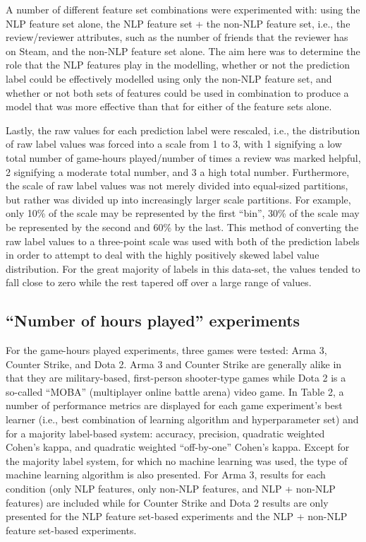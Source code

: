 \documentclass[9pt]{article}
\begin{document}
A number of different feature set combinations were experimented with: using the NLP feature set alone, the NLP feature set + the non-NLP feature set, i.e., the review/reviewer attributes, such as the number of friends that the reviewer has on Steam, and the non-NLP feature set alone. The aim here was to determine the role that the NLP features play in the modelling, whether or not the prediction label could be effectively modelled using only the non-NLP feature set, and whether or not both sets of features could be used in combination to produce a model that was more effective than that for either of the feature sets alone.

Lastly, the raw values for each prediction label were rescaled, i.e., the distribution of raw label values was forced into a scale from 1 to 3, with 1 signifying a low total number of game-hours played/number of times a review was marked helpful, 2 signifying a moderate total number, and 3 a high total number. Furthermore, the scale of raw label values was not merely divided into equal-sized partitions, but rather was divided up into increasingly larger scale partitions. For example, only 10\% of the scale may be represented by the first ``bin'', 30\% of the scale may be represented by the second and 60\% by the last. This method of converting the raw label values to a three-point scale was used with both of the prediction labels in order to attempt to deal with the highly positively skewed label value distribution. For the great majority of labels in this data-set, the values tended to fall close to zero while the rest tapered off over a large range of values.

\subsection{``Number of hours played'' experiments}
\label{ssec:hours_played}

For the game-hours played experiments, three games were tested: Arma 3, Counter Strike, and Dota 2. Arma 3 and Counter Strike are generally alike in that they are military-based, first-person shooter-type games while Dota 2 is a so-called ``MOBA'' (multiplayer online battle arena) video game. In Table 2, a number of performance metrics are displayed for each game experiment's best learner (i.e., best combination of learning algorithm and hyperparameter set) and for a majority label-based system: accuracy, precision, quadratic weighted Cohen's kappa, and quadratic weighted ``off-by-one'' Cohen's kappa. Except for the majority label system, for which no machine learning was used, the type of machine learning algorithm is also presented. For Arma 3, results for each condition (only NLP features, only non-NLP features, and NLP + non-NLP features) are included while for Counter Strike and Dota 2 results are only presented for the NLP feature set-based experiments and the NLP + non-NLP feature set-based experiments.
\end{document}
